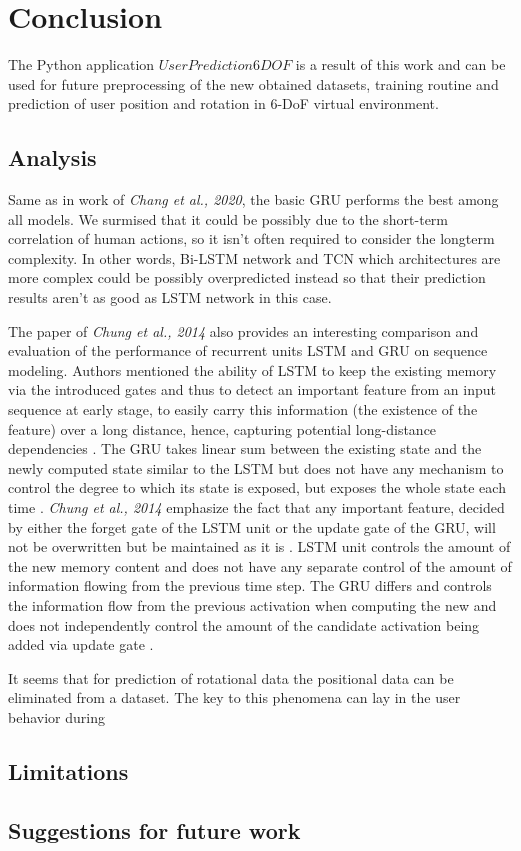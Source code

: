 \chapter{Conclusion}
\label{sec:conclusion}
The Python application $UserPrediction6DOF$ is a result of this work and can be used for future preprocessing of the new obtained datasets, training routine and prediction of user position and rotation in 6-DoF virtual environment. 

\section{Analysis}
\label{sec:conclusion:analysis}
Same as in work of \textit{Chang et al., 2020}, the basic GRU performs the best among all models. We surmised that it could be possibly due to the short-term correlation of human actions, so it isn’t often required to consider the longterm complexity. In other words, Bi-LSTM network and TCN which architectures are more complex could be possibly overpredicted instead so that their prediction results aren’t as good as LSTM network in this case.

The paper of \textit{Chung et al., 2014}  also provides an interesting comparison and evaluation of the performance of recurrent units LSTM and GRU on sequence modeling. Authors mentioned the ability of LSTM to keep the existing memory via the introduced gates and thus to detect an important feature from an input sequence at early stage, to easily carry this information (the existence of the feature) over a long distance, hence, capturing potential long-distance dependencies \cite{empirical_evaluation}. The GRU takes linear sum between the existing state and the newly computed state similar to the LSTM but does not have any mechanism to control the degree to which its state is exposed, but exposes the whole state each time \cite{empirical_evaluation}. \textit{Chung et al., 2014} emphasize the fact that any important feature, decided by either the forget gate of the LSTM unit or the update gate of the GRU, will not be overwritten but be maintained as it is \cite{empirical_evaluation}. LSTM unit controls the amount of the new memory content and does not have any separate control of the amount of information flowing from the previous time step. The GRU differs and controls the information flow from the previous activation when computing the new and does not independently control the amount of the candidate activation being added via update gate \cite{empirical_evaluation}.


It seems that for  prediction of rotational data the positional data can be eliminated from a dataset. The key to this phenomena can lay in the user behavior during 

\section{Limitations}
\label{sec:conclusion:limitations}

\section{Suggestions for future work}
\label{sec:conclusion:future}

